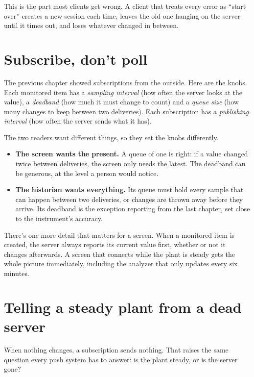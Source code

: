 This is the part most clients get wrong. A client that treats every error as
``start over'' creates a new session each time, leaves the old one hanging on
the server until it times out, and loses whatever changed in between.

\section{Subscribe, don't poll}

The previous chapter showed subscriptions from the outside. Here are the knobs.
Each monitored item has a \emph{sampling interval} (how often the server looks
at the value), a \emph{deadband} (how much it must change to count) and a
\emph{queue size} (how many changes to keep between two deliveries). Each
subscription has a \emph{publishing interval} (how often the server sends what
it has).

The two readers want different things, so they set the knobs differently.

\begin{itemize}
  \item \textbf{The screen wants the present.} A queue of one is right: if a
        value changed twice between deliveries, the screen only needs the
        latest. The deadband can be generous, at the level a person would
        notice.
  \item \textbf{The historian wants everything.} Its queue must hold every
        sample that can happen between two deliveries, or changes are thrown
        away before they arrive. Its deadband is the exception reporting from
        the last chapter, set close to the instrument's accuracy.
\end{itemize}

There's one more detail that matters for a screen. When a monitored item is
created, the server always reports its current value first, whether or not it
changes afterwards. A screen that connects while the plant is steady gets the
whole picture immediately, including the analyzer that only updates every six
minutes.

\section{Telling a steady plant from a dead server}

When nothing changes, a subscription sends nothing. That raises the same
question every push system has to answer: is the plant steady, or is the
server gone?

